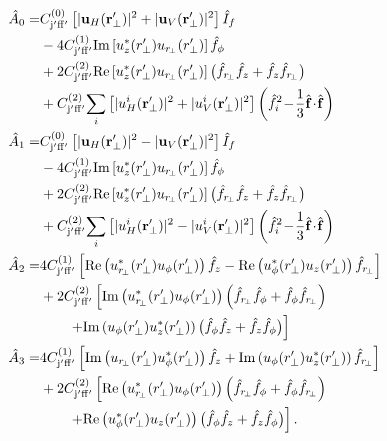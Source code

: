 \documentclass[preprint,aps,pra,onecolumn]{revtex4-1} %
\begin{document}
\begin{subequations} \label{Eq::StokesSpinOps}
\begin{align}
	\hat{A}_0 = & C^{(0)}_{\rm j'f f'} \left[|\mathbf{u}_{H}(\br'_\perp)|^2+ |\mathbf{u}_{V}(\br'_\perp)|^2 \right]\hat{I}_f \nonumber\\
	&-4C^{(1)}_{\rm j'ff'} \mathrm{Im}\left[u_z^*(r_\perp^\prime)u_{r\!_\perp}(r_\perp^\prime) \right]\hat{f}_\phi \nonumber\\
	&+ 2C^{(2)}_{\rm j'ff'}  \mathrm{Re}\left[u_z^*(r_\perp^\prime)u_{r\!_\perp}(r_\perp^\prime) \right]\big(\hat{f}_{r\!_\perp}\hat{f}_z+\hat{f}_z\hat{f}_{r\!_\perp} \big)\nonumber\\
	&+ C^{(2)}_{\rm j'ff'}\!\sum_i \left[|u^{i}_{H}(\br'_\perp)|^2 + |u^{i}_{V}(\br'_\perp)|^2 \right] \left(  \hat{f}_i^{2}\! -\! \frac{1}{3}\hat{\bf{f}}\! \cdot\!  \hat{\bf{f}} \right) \\
	\hat{A}_1 = & C^{(0)}_{\rm j'f f'} \left[|\mathbf{u}_{H}(\br'_\perp)|^2- |\mathbf{u}_{V}(\br'_\perp)|^2 \right]\hat{I}_f \nonumber\\
	& -4C^{(1)}_{\rm j'ff'} \mathrm{Im}\left[u_z^*(r_\perp^\prime)u_{r\!_\perp}(r_\perp^\prime) \right]\hat{f}_\phi \nonumber\\
	&+2 C^{(2)}_{\rm j'ff'}  \mathrm{Re}\left[u_z^*(r_\perp^\prime)u_{r\!_\perp}(r_\perp^\prime) \right]\big(\hat{f}_{r\!_\perp}\hat{f}_z+\hat{f}_z\hat{f}_{r\!_\perp} \big)\nonumber\\
	&+ C^{(2)}_{\rm j'ff'}\!\sum_i \left[|u^{i}_{H}(\br'_\perp)|^2- |u^{i}_{V}(\br'_\perp)|^2 \right] \left(  \hat{f}_i^{2}\! -\! \frac{1}{3}\hat{\bf{f}}\! \cdot\!  \hat{\bf{f}} \right) \\
	\hat{A}_2 = & 4C^{(1)}_{\rm j'ff'} \left[ \mathrm{Re} \left(u_{r\!_\perp}^*(r_\perp^\prime)u_\phi(r_\perp^\prime) \right)\hat{f}_z  -\mathrm{Re}\left( u_\phi^*(r_\perp^\prime) u_z(r_\perp^\prime) \right)\hat{f}_{r\!_\perp}\right] \nonumber\\
	&+2 C^{(2)}_{\rm j'ff'} \left[ \mathrm{Im} \left( u_{r\!_\perp}^*(r_\perp^\prime)u_\phi(r_\perp^\prime) \right)\left(\hat{f}_{r\!_\perp}\hat{f}_\phi +\hat{f}_\phi\hat{f}_{r\!_\perp} \right)\right.\nonumber\\
	&\quad \quad \left. + \mathrm{Im}\left( u_\phi(r_\perp^\prime) u_z^*(r_\perp^\prime) \right)\big(\hat{f}_\phi\hat{f}_z+\hat{f}_z\hat{f}_\phi \big)\right] \\
	\hat{A}_3 = & 4C^{(1)}_{\rm j'ff'} \left[\mathrm{Im} \left(u_{r\!_\perp}(r_\perp^\prime)u_\phi^*(r_\perp^\prime) \right)\hat{f}_z  +\mathrm{Im}\left( u_\phi(r_\perp^\prime) u_z^*(r_\perp^\prime) \right)\hat{f}_{r\!_\perp}\right] \nonumber\\
	&+ 2C^{(2)}_{\rm j'ff'} \left[ \mathrm{Re} \left( u_{r\!_\perp}^*(r_\perp^\prime)u_\phi(r_\perp^\prime) \right)\left(\hat{f}_{r\!_\perp}\hat{f}_\phi +\hat{f}_\phi\hat{f}_{r\!_\perp} \right)\right.\nonumber\\
	&\quad \quad \left. + \mathrm{Re}\left( u_\phi^*(r_\perp^\prime) u_z(r_\perp^\prime) \right)\big(\hat{f}_\phi\hat{f}_z+\hat{f}_z\hat{f}_\phi \big)\right].
\end{align}
\end{subequations}
\end{document}
